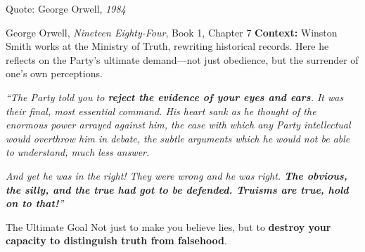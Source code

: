 \documentclass[aspectratio=169]{beamer}
\begin{document}
\begin{frame}{Quote: George Orwell, \textit{1984}}
\begin{exampleblock}{\faQuoteLeft\hspace{0.5em}George Orwell, \textit{Nineteen Eighty-Four}, Book 1, Chapter 7 \parencite{orwell_1984}}
\small
\textbf{Context:} Winston Smith works at the Ministry of Truth, rewriting historical records. Here he reflects on the Party's ultimate demand---not just obedience, but the surrender of one's own perceptions.

\vspace{0.5em}
\textit{``The Party told you to \textbf{reject the evidence of your eyes and ears}. It was their final, most essential command. His heart sank as he thought of the enormous power arrayed against him, the ease with which any Party intellectual would overthrow him in debate, the subtle arguments which he would not be able to understand, much less answer.}

\vspace{0.3em}
\textit{And yet he was in the right! They were wrong and he was right. \textbf{The obvious, the silly, and the true had got to be defended. Truisms are true, hold on to that!}''}
\end{exampleblock}

\vspace{0.2em}
\begin{block}{\faLightbulb\hspace{0.5em}The Ultimate Goal}
Not just to make you believe lies, but to \textbf{destroy your capacity to distinguish truth from falsehood}.
\end{block}
\end{frame}
\end{document}

